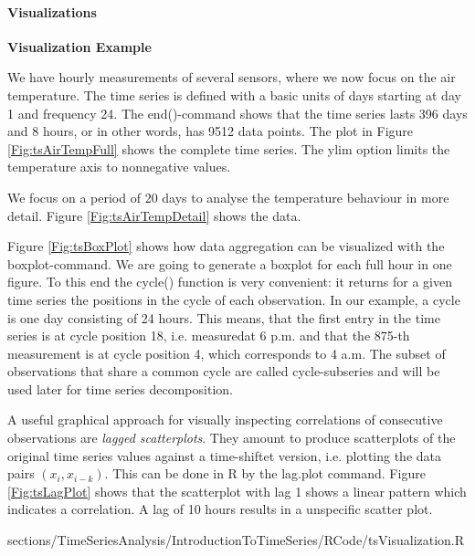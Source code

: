 		\paragraph{Visualizations}	
			\RTheory
			{
				\textbf{Visualization Example}
				
				\vfill
			
				We have hourly measurements of several sensors, where we now focus on the air temperature. The time series is defined with a basic units of days starting at day 1 and frequency 24. The {\color{blue}end()}-command shows that the time series lasts 396 days and 8 hours, or in other words, has 9512 data points. The plot in Figure \ref{Fig:tsAirTempFull} shows the complete time series. The {\color{blue}ylim} option limits the temperature axis to nonnegative values.
				
				\vfill
				
				\hfill
				
				\break
				
				We focus on a period of 20 days to analyse the temperature behaviour in more detail. Figure \ref{Fig:tsAirTempDetail} shows the data.
				
				\vfill
				
				\hfill
				
				\break
				
				Figure \ref{Fig:tsBoxPlot} shows how data aggregation can be visualized with the {\color{blue}boxplot}-command. We are going to generate a boxplot for each full hour in one figure. To this end the {\color{blue}cycle()} function is very convenient: it returns for a given time series the positions in the cycle of each observation. In our example, a cycle is one day consisting of 24 hours. This means, that the first entry in the time series is at cycle position 18, i.e. measuredat 6 p.m. and that the 875-th measurement is at cycle position 4, which corresponds to 4 a.m. The subset of observations that share a common cycle are called cycle-subseries and will be used later for time series decomposition.
				
				\vfill
				
				\hfill
				
				\break
				
				A useful graphical approach for visually inspecting correlations of consecutive observations are \textit{lagged scatterplots}. They amount to produce scatterplots of the original time series values against a time-shiftet version, i.e. plotting the data pairs $(x_i, x_{i-k})$. This can be done in {\color{blue}R} by the {\color{blue}lag.plot} command. Figure \ref{Fig:tsLagPlot} shows that the scatterplot with lag 1 shows a linear pattern which indicates a correlation. A lag of 10 hours results in a unspecific scatter plot.
			}
			{
				sections/TimeSeriesAnalysis/IntroductionToTimeSeries/RCode/tsVisualization.R
			}
			
